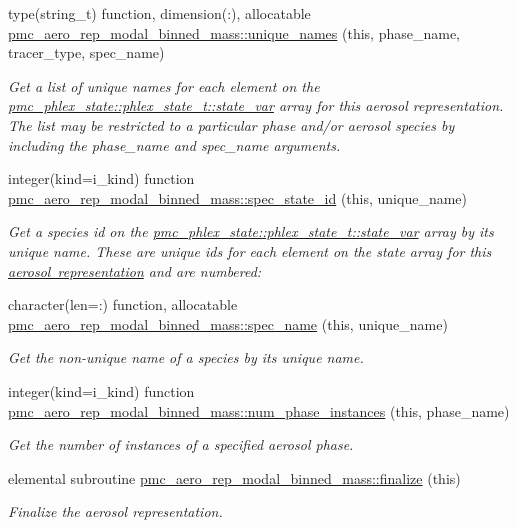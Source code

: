\begin{DoxyCompactItemize}
type(string\+\_\+t) function, dimension(\+:), allocatable \mbox{\hyperlink{namespacepmc__aero__rep__modal__binned__mass_ad8403a50ee93f3bb281012fb75f6decb}{pmc\+\_\+aero\+\_\+rep\+\_\+modal\+\_\+binned\+\_\+mass\+::unique\+\_\+names}} (this, phase\+\_\+name, tracer\+\_\+type, spec\+\_\+name)
\begin{DoxyCompactList}\small\item\em Get a list of unique names for each element on the {\ttfamily \mbox{\hyperlink{structpmc__phlex__state_1_1phlex__state__t_a78835cb552d483ebbfc7a6bc6f756918}{pmc\+\_\+phlex\+\_\+state\+::phlex\+\_\+state\+\_\+t\+::state\+\_\+var}}} array for this aerosol representation. The list may be restricted to a particular phase and/or aerosol species by including the phase\+\_\+name and spec\+\_\+name arguments. \end{DoxyCompactList}\item 
integer(kind=i\+\_\+kind) function \mbox{\hyperlink{namespacepmc__aero__rep__modal__binned__mass_a65da2848167c49c522dceaec65b275dd}{pmc\+\_\+aero\+\_\+rep\+\_\+modal\+\_\+binned\+\_\+mass\+::spec\+\_\+state\+\_\+id}} (this, unique\+\_\+name)
\begin{DoxyCompactList}\small\item\em Get a species id on the {\ttfamily \mbox{\hyperlink{structpmc__phlex__state_1_1phlex__state__t_a78835cb552d483ebbfc7a6bc6f756918}{pmc\+\_\+phlex\+\_\+state\+::phlex\+\_\+state\+\_\+t\+::state\+\_\+var}}} array by its unique name. These are unique ids for each element on the state array for this \mbox{\hyperlink{phlex_aero_rep}{aerosol representation}} and are numbered\+: \end{DoxyCompactList}\item 
character(len=\+:) function, allocatable \mbox{\hyperlink{namespacepmc__aero__rep__modal__binned__mass_ade11744688ec5a5d49cec9ce6f53ca66}{pmc\+\_\+aero\+\_\+rep\+\_\+modal\+\_\+binned\+\_\+mass\+::spec\+\_\+name}} (this, unique\+\_\+name)
\begin{DoxyCompactList}\small\item\em Get the non-\/unique name of a species by its unique name. \end{DoxyCompactList}\item 
integer(kind=i\+\_\+kind) function \mbox{\hyperlink{namespacepmc__aero__rep__modal__binned__mass_ab3b65af8bf414faf8d25c00c42a3c86f}{pmc\+\_\+aero\+\_\+rep\+\_\+modal\+\_\+binned\+\_\+mass\+::num\+\_\+phase\+\_\+instances}} (this, phase\+\_\+name)
\begin{DoxyCompactList}\small\item\em Get the number of instances of a specified aerosol phase. \end{DoxyCompactList}\item 
elemental subroutine \mbox{\hyperlink{namespacepmc__aero__rep__modal__binned__mass_ad6cd49efed6d2028c66061b1faa76ff7}{pmc\+\_\+aero\+\_\+rep\+\_\+modal\+\_\+binned\+\_\+mass\+::finalize}} (this)
\begin{DoxyCompactList}\small\item\em Finalize the aerosol representation. \end{DoxyCompactList}\end{DoxyCompactItemize}

